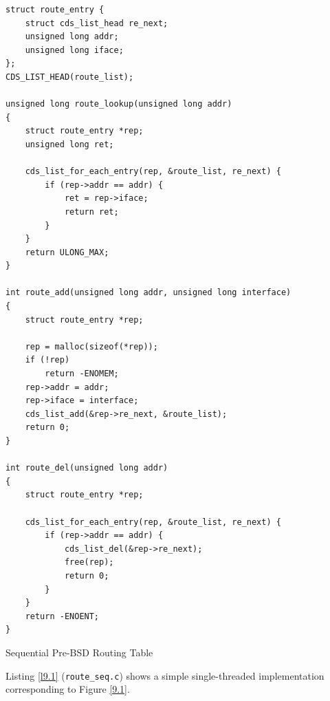 \documentclass[11pt]{article}
\begin{document}
\begin{listing}[htbp]
\begin{verbatim}
struct route_entry {
    struct cds_list_head re_next;
    unsigned long addr;
    unsigned long iface;
};
CDS_LIST_HEAD(route_list);

unsigned long route_lookup(unsigned long addr)
{
    struct route_entry *rep;
    unsigned long ret;

    cds_list_for_each_entry(rep, &route_list, re_next) {
        if (rep->addr == addr) {
            ret = rep->iface;
            return ret;
        }
    }
    return ULONG_MAX;
}

int route_add(unsigned long addr, unsigned long interface)
{
    struct route_entry *rep;

    rep = malloc(sizeof(*rep));
    if (!rep)
        return -ENOMEM;
    rep->addr = addr;
    rep->iface = interface;
    cds_list_add(&rep->re_next, &route_list);
    return 0;
}

int route_del(unsigned long addr)
{
    struct route_entry *rep;

    cds_list_for_each_entry(rep, &route_list, re_next) {
        if (rep->addr == addr) {
            cds_list_del(&rep->re_next);
            free(rep);
            return 0;
        }
    }
    return -ENOENT;
}
\end{verbatim}
\caption{\label{l9.1}Sequential Pre-BSD Routing Table}
\end{listing}

Listing \ref{l9.1} (\texttt{route\_seq.c}) shows a simple single-threaded implementation corresponding to Figure \ref{9.1}.
\end{document}
